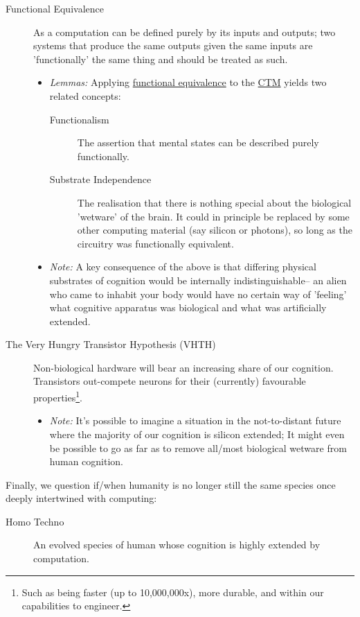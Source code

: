 \documentclass[logo,bsc,singlespacing,parskip]{infthesis}
\begin{document}
{\begin{mdframed}
\begin{description}
\item[{\label{org1ce07fc}Functional Equivalence}] As a computation can be defined purely by its inputs and outputs; two systems that produce the same outputs given the same inputs are 'functionally' the same thing and should be treated as such.
\begin{itemize}
\item \emph{Lemmas:} Applying \hyperref[org1ce07fc]{functional equivalence} to the \hyperref[org204d6ba]{CTM} yields two related concepts:
\begin{description}
\item[{Functionalism}] The assertion that mental states can be described purely functionally.
\item[{Substrate Independence}] The realisation that there is nothing special about the biological 'wetware' of the brain.
It could in principle be replaced by some other computing material (say silicon or photons), so long as the circuitry was functionally equivalent.
\end{description}
\item \emph{Note:} A key consequence of the above is that differing physical substrates of cognition would be internally indistinguishable-- an alien who came to inhabit your body would have no certain way of 'feeling' what cognitive apparatus was biological and what was artificially extended.
\end{itemize}
\end{description}
\end{mdframed}

\begin{mdframed}
\begin{description}
\item[{The Very Hungry Transistor Hypothesis (VHTH)}] Non-biological hardware will bear an increasing share of our cognition.
Transistors out-compete neurons for their (currently) favourable properties\footnote{Such as being faster (up to 10,000,000x), more durable, and within our capabilities to engineer.}.
\begin{itemize}
\item \emph{Note:} It's possible to imagine a situation in the not-to-distant future where the majority of our cognition is silicon extended; It might even be possible to go as far as to remove all/most biological wetware from human cognition.
\end{itemize}
\end{description}
\end{mdframed}

Finally, we question if/when humanity is no longer still the same species once deeply intertwined with computing:

\begin{mdframed}
\begin{description}
\item[{Homo Techno}] An evolved species of human whose cognition is highly extended by computation.
\end{description}
\end{mdframed}
}
\end{document}
